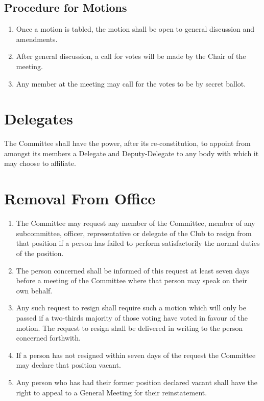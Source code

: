 \documentclass[11pt]{article} %
\begin{document}
\subsection{Procedure for Motions}
\begin{enumerate}
	\item Once a motion is tabled, the motion shall be open to general discussion and amendments.
	\item After general discussion, a call for votes will be made by the Chair of the meeting.
	\item Any member at the meeting may call for the votes to be by secret ballot.
\end{enumerate}

\section{Delegates}
The Committee shall have the power, after its re-constitution, to appoint from amongst its members a Delegate and Deputy-Delegate to any body with which it may choose to affiliate.

\section{Removal From Office}
\begin{enumerate}
	\item The Committee may request any member of the Committee, member of any subcommittee, officer, representative or delegate of the Club to resign from that position if a person has failed to perform satisfactorily the normal duties of the position.
	\item The person concerned shall be informed of this request at least seven days before a meeting of the Committee where that person may speak on their own behalf.
	\item Any such request to resign shall require such a motion which will only be passed if a two-thirds majority of those voting have voted in favour of the motion. The request to resign shall be delivered in writing to the person concerned forthwith.
	\item If a person has not resigned within seven days of the request the Committee may declare that position vacant.
	\item Any person who has had their former position declared vacant shall have the right to appeal to a General Meeting for their reinstatement.
\end{enumerate}
\end{document}
